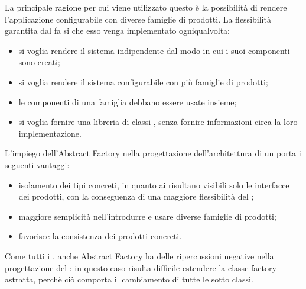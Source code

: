 	La principale ragione per cui viene utilizzato questo  è la possibilità di rendere l'applicazione configurabile con diverse famiglie di prodotti. La flessibilità garantita dal  fa si che esso venga implementato ogniqualvolta:
	\begin{itemize}
		\item si voglia rendere il sistema indipendente dal modo in cui i suoi componenti sono creati;
		\item si voglia rendere il sistema configurabile con più famiglie di prodotti;
		\item le componenti di una famiglia debbano essere usate insieme;
		\item si voglia fornire una libreria di classi , senza fornire informazioni circa la loro implementazione.
	\end{itemize}
		L'impiego dell'Abstract Factory nella progettazione dell'architettura di un   porta i seguenti vantaggi:
		\begin{itemize}
			\item isolamento dei tipi concreti, in quanto ai  risultano visibili solo le interfacce dei prodotti, con la conseguenza di una maggiore flessibilità del ;
			\item maggiore semplicità nell'introdurre e usare diverse famiglie di prodotti;
			\item favorisce la consistenza dei prodotti concreti.
		\end{itemize}
		Come tutti i , anche Abstract Factory ha delle ripercussioni negative nella progettazione del : in questo caso risulta difficile estendere la classe factory astratta, perchè ciò comporta il cambiamento di tutte le sotto classi.

